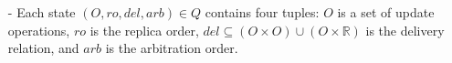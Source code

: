 \begin{itemize}
\setlength{\itemsep}{0.5pt}
\item[-] Each state $(O,\mathit{ro},\mathit{del},\mathit{arb}) \in Q$ contains four tuples: $O$ is a set of update operations, $\mathit{ro}$ is the replica order, $\mathit{del} \subseteq (O \times O) \cup (O \times \mathbb{R})$ is the delivery relation, and $\mathit{arb}$ is the arbitration order.







\end{itemize}

